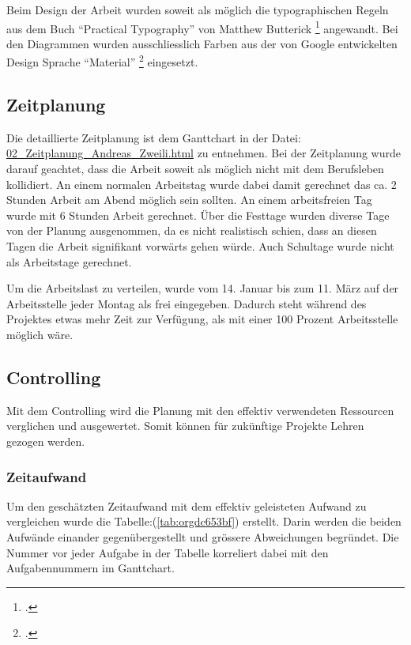 Beim Design der Arbeit wurden soweit als möglich die typographischen Regeln aus
dem Buch "`Practical Typography"' von Matthew Butterick \footcite{typo} angewandt.
Bei den Diagrammen wurden ausschliesslich Farben aus der von Google
entwickelten Design Sprache "`Material"' \footcite{material} eingesetzt.

\subsection{Zeitplanung}
\label{sec:org3e1f3c8}

Die detaillierte Zeitplanung ist dem Ganttchart in der Datei:\newline
\href{02\_Zeitplanung\_Andreas\_Zweili.html}{02\_Zeitplanung\_Andreas\_Zweili.html}
zu entnehmen. Bei der Zeitplanung wurde darauf geachtet, dass die Arbeit soweit
als möglich nicht mit dem Berufsleben kollidiert. An einem normalen Arbeitstag
wurde dabei damit gerechnet das ca. 2 Stunden Arbeit am Abend möglich sein
sollten. An einem arbeitsfreien Tag wurde mit 6 Stunden Arbeit gerechnet. Über
die Festtage wurden diverse Tage von der Planung ausgenommen, da es nicht
realistisch schien, dass an diesen Tagen die Arbeit signifikant vorwärts gehen
würde. Auch Schultage wurde nicht als Arbeitstage gerechnet.

Um die Arbeitslast zu verteilen, wurde vom 14. Januar bis zum 11. März auf der
Arbeitsstelle jeder Montag als frei eingegeben. Dadurch steht während des
Projektes etwas mehr Zeit zur Verfügung, als mit einer 100 Prozent
Arbeitsstelle möglich wäre.

\subsection{Controlling}
\label{sec:org208d93d}

Mit dem Controlling wird die Planung mit den effektiv verwendeten Ressourcen
verglichen und ausgewertet. Somit können für zukünftige Projekte Lehren gezogen
werden.

\subsubsection{Zeitaufwand}
\label{sec:org48b7af7}

Um den geschätzten Zeitaufwand mit dem effektiv geleisteten Aufwand zu
vergleichen wurde die Tabelle:(\ref{tab:orgdc653bf}) erstellt. Darin werden die beiden
Aufwände einander gegenübergestellt und grössere Abweichungen begründet.
Die Nummer vor jeder Aufgabe in der Tabelle korreliert dabei mit den
Aufgabennummern im Ganttchart.

